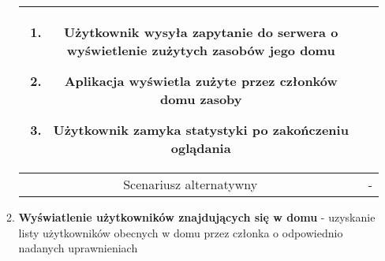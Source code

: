 \documentclass{article}
\begin{document}
\begin{enumerate}
\begin{enumerate}
\begin{table}[H]
\begin{tabular}{|c|p{7cm}|}
\begin{enumerate}
\item Użytkownik wysyła zapytanie do serwera o wyświetlenie zużytych zasobów jego domu

\item Aplikacja wyświetla zużyte przez członków domu zasoby

\item Użytkownik zamyka statystyki po zakończeniu oglądania\end{enumerate} \\
						\hline
						Scenariusz alternatywny & -                                                                                                                                                                                                                                                                                             \\
						\hline
					\end{tabular}
				\end{table}

			\item \textbf{Wyświatlenie użytkowników znajdujących się w domu} -
				uzyskanie listy użytkowników obecnych w domu przez członka o odpowiednio
				nadanych uprawnieniach


\end{enumerate}
\end{enumerate}
\end{document}
